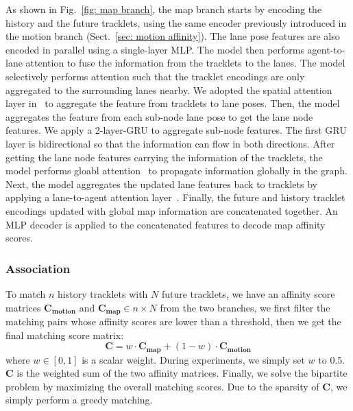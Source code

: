 \documentclass{article} \usepackage{iclr2023_conference,times}
\begin{document}
As shown in Fig.~\ref{fig: map branch}, the map branch starts by encoding the history and the future tracklets, using the same encoder previously introduced in the motion branch (Sect.~\ref{sec: motion affinity}). The lane pose features are also encoded in parallel using a single-layer MLP. The model then performs agent-to-lane attention to fuse the information from the tracklets to the lanes. The model selectively performs attention such that the tracklet encodings are only aggregated to the surrounding lanes nearby. We adopted the spatial attention layer in~\cite{laneGCN} to aggregate the feature from tracklets to lane poses.
Then, the model aggregates the feature from each sub-node lane pose to get the lane node features. We apply a 2-layer-GRU to aggregate sub-node features. The first GRU layer is bidirectional so that the information can flow in both directions. 
After getting the lane node features carrying the information of the tracklets, the model performs gloabl attention~\cite{Transformer_attention} to propagate information globally in the graph.
Next, the model aggregates the updated lane features back to tracklets by applying a lane-to-agent attention layer~\cite{laneGCN}. Finally, the future and history tracklet encodings updated with global map information are concatenated together. An MLP decoder is applied to the concatenated features to decode map affinity scores.

\vspace{-1mm}
\subsubsection{Association}
\vspace{-1mm}
To match $n$ history tracklets with $N$ future tracklets, we have an affinity score matrices $\boldsymbol{C_{motion}}$ and $ \boldsymbol{C_{map}} \in n \times N$ from the two branches, we first filter the matching pairs whose affinity scores are lower than a threshold, then we get the final matching score matrix:
\begin{equation}
\boldsymbol{C}= w \cdot \boldsymbol{C_{map}} + (1-w) \cdot
 \boldsymbol{C_{motion}}
\end{equation}
where $w \in [0,1]$ is a scalar weight. During experiments, we simply set $w$ to 0.5.
 $\boldsymbol{C}$ is the weighted sum of the two affinity matrices. Finally, we solve the bipartite problem by maximizing the overall matching scores. Due to the sparsity of $\boldsymbol{C}$, we simply perform a greedy matching.
\vspace{-1mm}
\end{document}
